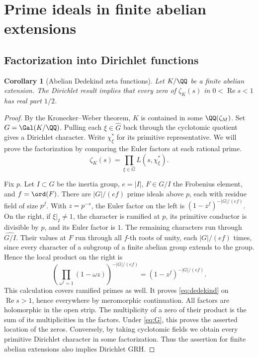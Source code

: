 \documentclass[a4paper,11pt]{article}
\newtheorem{corollary}[proposition]{Corollary}
\theoremstyle{definition}
\theoremstyle{remark}
\newcommand{\real}{\operatorname{Re}}\newcommand{\imag}{\operatorname{Im}}
\numberwithin{equation}{section}
\begin{document}
\section{Prime ideals in finite abelian extensions}\label{nav:I-13}
\label{sect:abelian}

\subsection{Factorization into Dirichlet functions}\label{nav:I-14}
\label{sec:abel}
\begin{corollary}[Abelian Dedekind zeta functions]\label{cor:abelian}
Let \(K/\QQ\) be a finite abelian extension. The Dirichlet result implies that every zero of \(\zeta_K(s)\) in \(0<\real s<1\) has real part \(1/2\).

\end{corollary}
\begin{proof}
By the Kronecker--Weber theorem, \(K\) is contained in some \(\QQ(\zeta_M)\). Set \(G=\Gal(K/\QQ)\). Pulling each \(\xi\in\widehat G\) back through the cyclotomic quotient gives a Dirichlet character. Write \(\chi_\xi^*\) for its primitive representative. We will prove the factorization by comparing the Euler factors at each rational prime.
\begin{equation}
                 \zeta_K(s)=\prod_{\xi\in\widehat G}L(s,\chi_\xi^*).
                 \label{eq:dedekind}
\end{equation}

Fix \(p\). Let \(I\subset G\) be the inertia group, \(e=|I|\), \(F\in G/I\) the Frobenius element, and \(f=\ord(F)\). There are \(|G|/(ef)\) prime ideals above \(p\), each with residue field of size \(p^f\). With \(z=p^{-s}\), the Euler factor on the left is \((1-z^f)^{-|G|/(ef)}\). On the right, if \(\xi|_I\ne1\), the character is ramified at \(p\), its primitive conductor is divisible by \(p\), and its Euler factor is \(1\). The remaining characters run through \(\widehat{G/I}\). Their values at \(F\) run through all \(f\)-th roots of unity, each \(|G|/(ef)\) times, since every character of a subgroup of a finite abelian group extends to the group. Hence the local product on the right is
\[
       \left(\prod_{\omega^f=1}(1-\omega z)\right)^{-|G|/(ef)}
                         =(1-z^f)^{-|G|/(ef)} .
\]
This calculation covers ramified primes as well. It proves \eqref{eq:dedekind} on \(\real s>1\), hence everywhere by meromorphic continuation. All factors are holomorphic in the open strip. The multiplicity of a zero of their product is the sum of its multiplicities in the factors. Under \eqref{eq:G}, this proves the asserted location of the zeros. Conversely, by taking cyclotomic fields we obtain every primitive Dirichlet character in some factorization. Thus the assertion for finite abelian extensions also implies Dirichlet GRH.

\end{proof}
\end{document}
